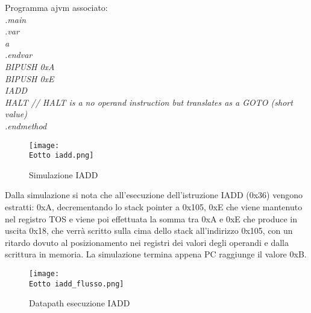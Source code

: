 \documentclass[12pt]{article}
\def \Eotto {Allegati/Esercizio8/}
\begin{document}
\vspace{0.5cm}
Programma ajvm associato:
\textit{
    \\.main
    \\.var
    \\a
    \\.endvar
    \\BIPUSH 0xA
    \\BIPUSH 0xE
    \\IADD
    \\HALT // HALT is a no operand instruction but translates as a GOTO (short value)
    \\.endmethod
}
\vspace{3cm}
\begin{figure}[ht]
    \centering
    \texttt{[image: \\Eotto iadd.png]}
    \caption{Simulazione IADD}
\end{figure}
\clearpage
Dalla simulazione si nota che all’esecuzione dell’istruzione IADD (0x36) vengono estratti: 0xA, decrementando lo stack pointer a 0x105, 0xE che viene mantenuto nel registro TOS e viene poi effettuata la somma tra 0xA e 0xE che produce in uscita 0x18, che verrà scritto sulla cima dello stack all’indirizzo 0x105, con un ritardo dovuto al posizionamento nei registri dei valori degli operandi e dalla scrittura in memoria. La simulazione termina appena PC raggiunge il valore 0xB.
\begin{figure}[ht!]
    \centering
    \texttt{[image: \\Eotto iadd\_flusso.png]}
    \caption{Datapath esecuzione IADD}
\end{figure}
\clearpage
\end{document}
